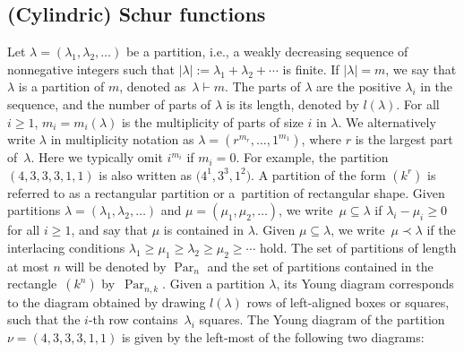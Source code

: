 \documentclass[pdftex]{sigma}
\numberwithin{equation}{section}
\renewcommand{\geq}{\geqslant}
\DeclareMathOperator{\Par}{Par}
\newcommand{\abs}[1]{\vert#1\vert}
\newcommand{\la}{\lambda}
\begin{document}
\subsection{(Cylindric) Schur functions}

Let $\la=(\la_1,\la_2,\dots)$ be a partition, i.e., a weakly decreasing
sequence of nonnegative integers such that $\abs{\la}:=\la_1+\la_2+\cdots$
is finite.
If $\abs{\la}=m$, we say that $\la$ is a partition of $m$, denoted as~${\la\vdash m}$.
The parts of $\la$ are the positive $\la_i$ in the sequence,
and the number of parts of $\la$ is its length, denoted by $l(\la)$.
For all $i\geq 1$, $m_i=m_i(\la)$ is the multiplicity of parts of size
$i$ in $\la$.
We alternatively write $\la$ in multiplicity notation as
$\la=(r^{m_r},\dots,1^{m_1})$, where $r$ is the largest part of~$\la$.
Here we typically omit $i^{m_i}$ if $m_i=0$.
For example, the partition $(4,3,3,3,1,1)$ is also written as
$\bigl(4^1,3^3,1^2\bigr)$.
A partition of the form $(k^r)$ is referred to as a rectangular
partition or a~partition of rectangular shape.
Given partitions $\la=(\la_1,\la_2,\dots)$ and $\mu=(\mu_1,\mu_2,\dots)$,
we write~${\mu\subseteq\la}$ if $\la_i-\mu_i\geq 0$ for all $i\geq 1$,
and say that $\mu$ is contained in $\la$.
Given $\mu\subseteq\la$, we write~${\mu\prec\la}$ if the interlacing conditions
$\la_1\geq\mu_1\geq\la_2\geq\mu_2\geq\cdots$ hold.
The set of partitions of length at most $n$ will be denoted by
$\Par_n$ and the set of partitions contained in the rectangle~$(k^n)$
by~$\Par_{n,k}$.
Given a partition $\la$, its Young diagram corresponds to the diagram
obtained by drawing $l(\la)$ rows of left-aligned boxes or squares, such that
the $i$-th row contains~$\la_i$ squares.
The Young diagram of the partition $\nu=(4,3,3,3,1,1)$ is given by
the left-most of the following two diagrams:
\begin{center}
\end{center}
\end{document}
